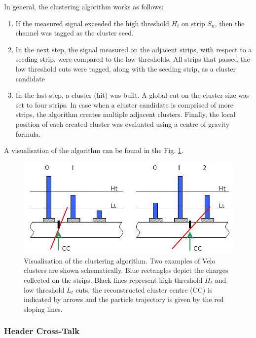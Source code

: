 In general, the clustering algorithm works as follows\cite{Parkes:1074928}:
\begin{enumerate}
  \item If the measured signal exceeded the high threshold $H_{t}$ on strip $S_{n}$, then the channel was tagged as the cluster seed.
  \item In the next step, the signal measured on the adjacent strips, with respect to a seeding strip, were compared to the low thresholds. All strips that passed the low threshold cuts were tagged, along with the seeding strip, as a cluster candidate
  \item In the last step, a cluster (hit) was built. A global cut on the cluster size was set to four strips. In case when a cluster candidate is comprised of more strips, the algorithm creates multiple adjacent clusters. Finally, the local position of each created cluster was evaluated using a centre of gravity formula.
\end{enumerate}

A visualisation of the algorithm can be found in the Fig. \ref{plot:velo_clustering}.

\begin{figure}
    \centering
    \includegraphics[width=0.7\linewidth]{figures/chapter2/clustering_algorithm_velo.png}
    \caption{Visualisation of the clustering algorithm. Two examples of Velo clusters are shown schematically. Blue rectangles depict the charges collected on the strips. Black lines represent high threshold $H_{t}$ and low threshold $L_{t}$ cuts, the reconstructed cluster centre (CC) is indicated by arrows and the particle trajectory is given by the red sloping lines.}
    \label{plot:velo_clustering}
\end{figure}

\subsubsection{Header Cross-Talk}
\label{chap2:headercrosstalk}

